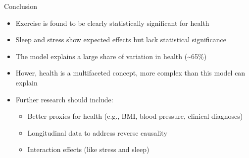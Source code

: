 \documentclass[
  11pt,
  ignorenonframetext,
]{beamer}
\providecommand{\tightlist}{%
  \setlength{\itemsep}{0pt}\setlength{\parskip}{0pt}}
\begin{document}
\begin{frame}{Conclusion}
\begin{itemize}
\item
  Exercise is found to be clearly statistically significant for health
\item
  Sleep and stress show expected effects but lack statistical
  significance
\item
  The model explains a large share of variation in health
  (\textasciitilde65\%)
\item
  Hower, health is a multifaceted concept, more complex than this model
  can explain
\item
  Further research should include:

  \begin{itemize}
  \tightlist
  \item
    Better proxies for health (e.g., BMI, blood pressure, clinical
    diagnoses)
  \item
    Longitudinal data to address reverse causality
  \item
    Interaction effects (like stress and sleep)
  \end{itemize}
\end{itemize}
\end{frame}
\end{document}
